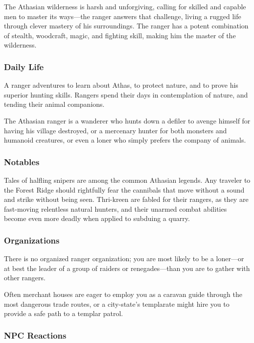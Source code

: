 The Athasian wilderness is harsh and unforgiving, calling for skilled and capable men to master its ways---the ranger answers that challenge, living a rugged life through clever mastery of his surroundings. The ranger has a potent combination of stealth, woodcraft, magic, and fighting skill, making him the master of the wilderness.

\subsubsection{Daily Life}

A ranger adventures to learn about Athas, to protect nature, and to prove his superior hunting skills. Rangers spend their days in contemplation of nature, and tending their animal companions.

The Athasian ranger is a wanderer who hunts down a defiler to avenge himself for having his village destroyed, or a mercenary hunter for both monsters and humanoid creatures, or even a loner who simply prefers the company of animals.

\subsubsection{Notables}

Tales of halfling snipers are among the common Athasian legends. Any traveler to the Forest Ridge should rightfully fear the cannibals that move without a sound and strike without being seen. Thri-kreen are fabled for their rangers, as they are fast-moving relentless natural hunters, and their unarmed combat abilities become even more deadly when applied to subduing a quarry.

\subsubsection{Organizations}

There is no organized ranger organization; you are most likely to be a loner---or at best the leader of a group of raiders or renegades---than you are to gather with other rangers.

Often merchant houses are eager to employ you as a caravan guide through the most dangerous trade routes, or a city-state's templarate might hire you to provide a safe path to a templar patrol.

\subsubsection{NPC Reactions}

